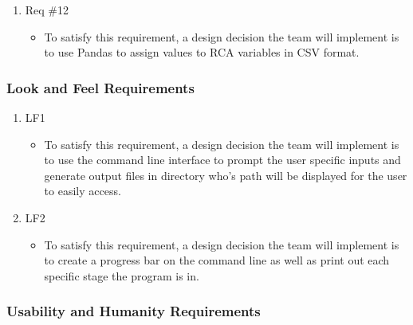 \documentclass[12pt, titlepage]{article}
\begin{document}
\begin{enumerate}
\begin{itemize}
    \end{itemize}
    \item Req \#12
    \begin{itemize}
        \item To satisfy this requirement, a design decision the team will implement is to use Pandas to assign values to RCA variables in CSV format.
    \end{itemize}
\end{enumerate}

\subsubsection{Look and Feel Requirements}

\begin{enumerate}
    \item LF1
    \begin{itemize}
        \item To satisfy this requirement, a design decision the team will implement is to use the command line interface to prompt the user specific inputs and generate output files in directory who's path will be displayed for the user to easily access.
    \end{itemize}
    \item LF2
    \begin{itemize}
        \item To satisfy this requirement, a design decision the team will implement is to create a progress bar on the command line as well as print out each specific stage the program is in.
    \end{itemize}
\end{enumerate}

\subsubsection{Usability and Humanity Requirements}
\end{document}
